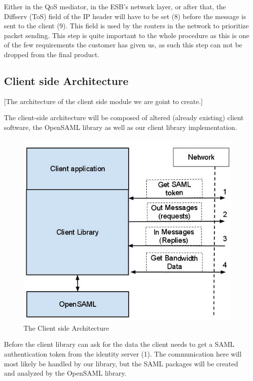 \documentclass[12pt]{article}
\begin{document}
        Either in the QoS mediator, in the ESB’s network layer, or after that, the Diffserv (ToS) field of the IP header will have to be set (8) before the message is sent to the client (9). This field is used by the routers in the network to prioritize packet sending. This step is quite important to the whole procedure as this is one of the few requirements the customer has given us, as such this step can not be dropped from the final product.

    \subsection{Client side Architecture}\label{clientsidearch} [The architecture of the client side module we are goint to create.] 
    
        The client-side architecture will be composed of altered (already existing) client software, the OpenSAML library as well as our client library implementation.
        
        \begin{figure}[htb]
            \centering
            \includegraphics[scale=0.4]{clientside}
            \caption{The Client side Architecture}
            \label{fig:clientside}
        \end{figure}
 
        Before the client library can ask for the data the client needs to get a SAML authentication token from the identity server (1). The communication here will most likely be handled by our library, but the SAML packages will be created and analyzed by the OpenSAML library. 
\end{document}

